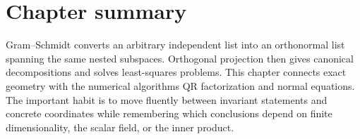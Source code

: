 \section*{Chapter summary}
Gram–Schmidt converts an arbitrary independent list into an orthonormal list spanning the same nested subspaces. Orthogonal projection then gives canonical decompositions and solves least-squares problems. This chapter connects exact geometry with the numerical algorithms QR factorization and normal equations.
The important habit is to move fluently between invariant statements and concrete coordinates while remembering which conclusions depend on finite dimensionality, the scalar field, or the inner product.
